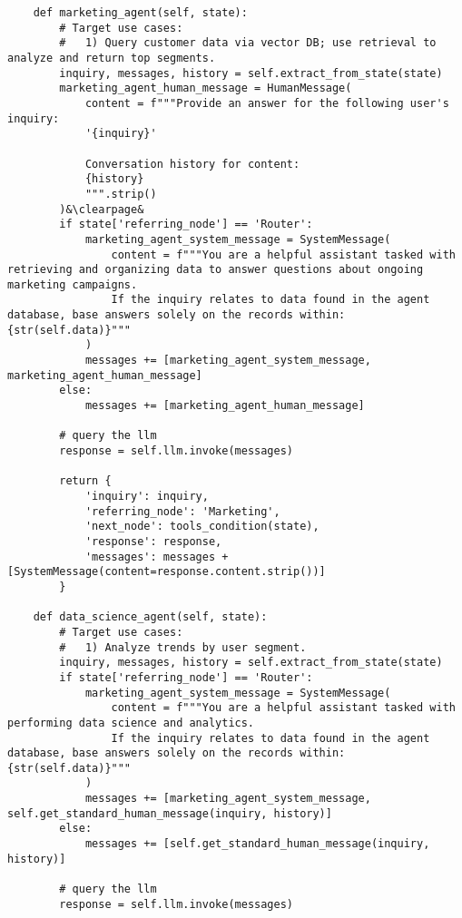 \documentclass[11pt,letterpaper]{article}
\begin{document}
\begin{lstlisting}
    def marketing_agent(self, state):
        # Target use cases:
        #   1) Query customer data via vector DB; use retrieval to analyze and return top segments.
        inquiry, messages, history = self.extract_from_state(state)
        marketing_agent_human_message = HumanMessage(
            content = f"""Provide an answer for the following user's inquiry: 
            '{inquiry}'

            Conversation history for content:
            {history}
            """.strip()
        )&\clearpage&
        if state['referring_node'] == 'Router':
            marketing_agent_system_message = SystemMessage(
                content = f"""You are a helpful assistant tasked with retrieving and organizing data to answer questions about ongoing marketing campaigns.
                If the inquiry relates to data found in the agent database, base answers solely on the records within: {str(self.data)}"""
            )
            messages += [marketing_agent_system_message, marketing_agent_human_message]
        else:
            messages += [marketing_agent_human_message]

        # query the llm
        response = self.llm.invoke(messages)

        return {
            'inquiry': inquiry,
            'referring_node': 'Marketing',
            'next_node': tools_condition(state),
            'response': response,
            'messages': messages + [SystemMessage(content=response.content.strip())]
        }
    
    def data_science_agent(self, state):
        # Target use cases:
        #   1) Analyze trends by user segment.
        inquiry, messages, history = self.extract_from_state(state)
        if state['referring_node'] == 'Router':
            marketing_agent_system_message = SystemMessage(
                content = f"""You are a helpful assistant tasked with performing data science and analytics.
                If the inquiry relates to data found in the agent database, base answers solely on the records within: {str(self.data)}"""
            )
            messages += [marketing_agent_system_message, self.get_standard_human_message(inquiry, history)]
        else:
            messages += [self.get_standard_human_message(inquiry, history)]

        # query the llm
        response = self.llm.invoke(messages)


\end{lstlisting}
\end{document}
